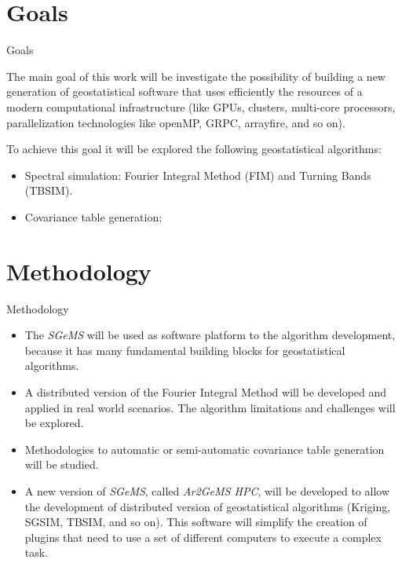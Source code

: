 \section{Goals}
\begin{frame}{Goals}

The main goal of this work will be investigate the possibility of building a new generation of geostatistical software that uses efficiently the resources of a modern computational infrastructure (like GPUs, clusters, multi-core processors, parallelization technologies like openMP, GRPC, arrayfire, and so on).

To achieve this goal it will be explored the following geostatistical algorithms:

\begin{itemize}
	\item Spectral simulation: Fourier Integral Method (FIM) and Turning Bands (TBSIM).
    \item Covariance table generation;
\end{itemize}
\end{frame}


\section{Methodology}
\begin{frame}{Methodology}
	\begin{itemize}
		\item The \textit{SGeMS} \cite{remy2009applied} will be used as software platform to the algorithm development, because it has many fundamental building blocks for geostatistical algorithms.
        \item A distributed version of the Fourier Integral Method will be developed and applied in real world scenarios. The algorithm limitations and challenges will be explored.
        \item Methodologies to automatic or semi-automatic covariance table generation will be studied.
        \item A new version of \textit{SGeMS}, called \textit{Ar2GeMS HPC}, will be developed to allow the development of distributed version of geostatistical algorithms (Kriging, SGSIM, TBSIM, and so on). This software will simplify the creation of plugins that need to use a set of different computers to execute a complex task.
	\end{itemize}
\end{frame}


